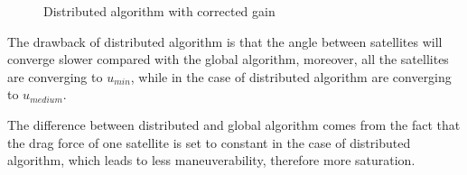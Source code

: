 \begin{table}[H]
\begin{minipage}[b]{0.49\linewidth}
\begin{figure}[H]
			\caption{Distributed algorithm with corrected gain}
			\label{fig:da2}
		\end{figure}
	\end{minipage}
\end{table}
The drawback of distributed algorithm is that the angle between satellites will converge slower compared with the global algorithm, moreover, all the satellites are converging to $u_{min}$, while in the case of distributed algorithm are converging to $u_{medium}$. 

The difference between distributed and global algorithm comes from the fact that the drag force of one satellite is set to constant in the case of distributed algorithm, which leads to less maneuverability, therefore more saturation.